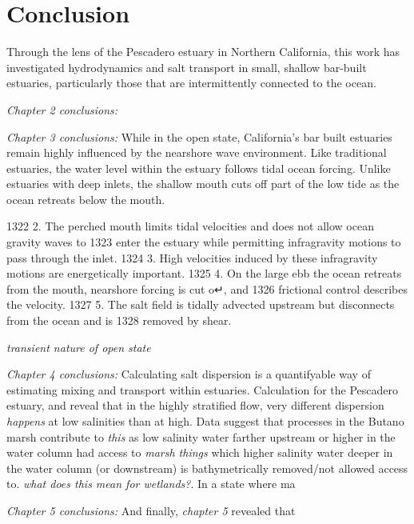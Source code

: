 \chapter{Conclusion}
\label{conclusion}

Through the lens of the Pescadero estuary in Northern California, this work has investigated hydrodynamics and salt transport in small, shallow bar-built estuaries, particularly those that are intermittently connected to the ocean. 

\emph{Chapter 2 conclusions:}

\emph{Chapter 3 conclusions:}
While in the open state, California's bar built estuaries remain highly influenced by the nearshore wave environment. Like traditional estuaries, the water level within the estuary follows tidal ocean forcing. Unlike estuaries with deep inlets, the shallow mouth cuts off part of the low tide as the ocean retreats below the mouth. 


1322 2. The perched mouth limits tidal velocities and does not allow ocean gravity waves to
1323 enter the estuary while permitting infragravity motions to pass through the inlet.
1324 3. High velocities induced by these infragravity motions are energetically important.
1325 4. On the large ebb the ocean retreats from the mouth, nearshore forcing is cut o↵, and
1326 frictional control describes the velocity.
1327 5. The salt field is tidally advected upstream but disconnects from the ocean and is
1328 removed by shear.

\emph{transient nature of open state}


\emph{Chapter 4 conclusions:}
Calculating salt dispersion is a quantifyable way of estimating mixing and transport within estuaries. Calculation for the Pescadero estuary, and reveal that in the highly stratified flow, very different dispersion \emph{happens} at low salinities than at high. Data suggest that processes in the Butano marsh contribute to \emph{this} as low salinity water farther upstream or higher in the water column had access to \emph{marsh things} which higher salinity water deeper in the water column (or downstream) is bathymetrically removed/not allowed access to.  \emph{what does this mean for wetlands?}. In a state where ma

\emph{Chapter 5 conclusions:}
And finally, \emph{chapter 5} revealed that 
